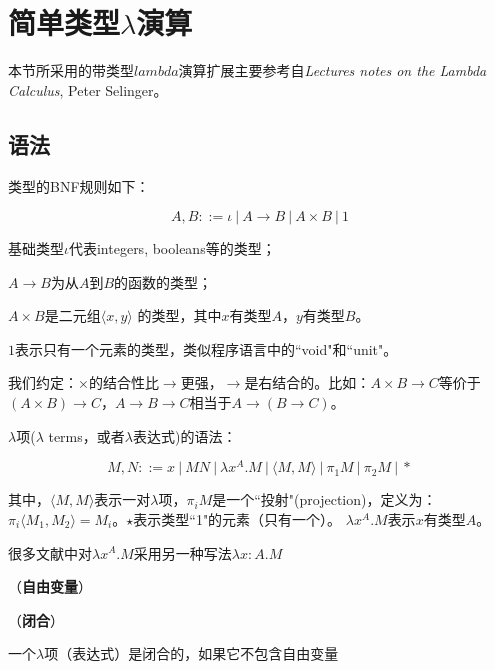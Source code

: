 \section{简单类型$\lambda$演算}

本节所采用的带类型$lambda$演算扩展主要参考自\emph{Lectures notes on the Lambda Calculus}, Peter Selinger。

\subsection{语法}

类型的BNF规则如下：

$$A, B ::= \iota \ | \ A \to B \ | \ A \times B  \ | \ 1$$

\begin{tightenum}
  \item 基础类型$\iota$代表integers, booleans等的类型；
  \item $A \to B$为从$A$到$B$的函数的类型；
  \item $A \times B$是二元组$\langle x, y \rangle$ 的类型，其中$x$有类型$A$，$y$有类型$B$。
  \item $1$表示只有一个元素的类型，类似程序语言中的``void"和``unit"。
\end{tightenum}


我们约定：$\times$的结合性比$\to$更强，$\to$是右结合的。比如：$A \times B \to C$等价于$(A \times B) \to C$，$A \to B \to C$相当于$A \to (B \to C)$。


$\lambda$项($\lambda$ terms，或者$\lambda$表达式)的语法：

$$M, N ::= x \ | \ M N \ | \ \lambda x^A . M \ | \ \langle M, M \rangle \ | \ \pi_1 M \ | \ \pi_2 M \ | \ * $$

其中，$\langle M, M \rangle$表示一对$\lambda$项，$\pi_i M$是一个``投射"(projection)，定义为：$\pi_i \langle M_1, M_2 \rangle = M_i$。$\star$表示类型``1"的元素（只有一个）。 $\lambda x^A. M$表示$x$有类型$A$。

\begin{rem}

很多文献中对$\lambda x^A. M$采用另一种写法$\lambda x:A. M$
\end{rem}


\begin{defn} （\textbf{自由变量}）


\end{defn}

\begin{defn}（\textbf{闭合}）

一个$\lambda$项（表达式）是闭合的，如果它不包含自由变量
\end{defn}



